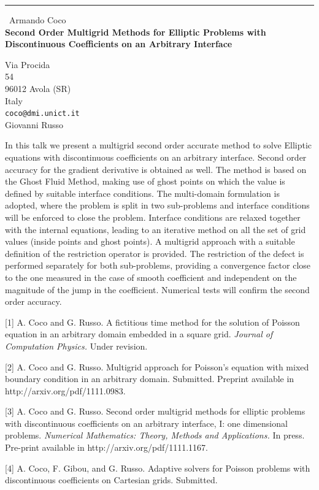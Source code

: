 \documentclass{report}
\begin{document}
\begin{center}
\rule{6in}{1pt} \
{\large Armando Coco \\
{\bf Second Order Multigrid Methods for Elliptic Problems with Discontinuous Coefficients on an Arbitrary Interface}}

Via Procida \\ 54 \\ 96012 Avola (SR) \\ Italy
\\
{\tt coco@dmi.unict.it}\\
Giovanni Russo\end{center}

In this talk we present a multigrid second order accurate method to solve
Elliptic equations with discontinuous coefficients on an arbitrary
interface. Second order accuracy for the gradient derivative is obtained
as well. The method is based on the Ghost Fluid Method, making use of
ghost points on which the value is defined by suitable interface
conditions. The multi-domain formulation is adopted, where the problem is
split in two sub-problems and interface conditions will be enforced to
close the problem. Interface conditions are relaxed together with the
internal equations, leading to an iterative method on all the set of grid
values (inside points and ghost points). A multigrid approach with a
suitable definition of the restriction operator is provided. The
restriction of the defect is performed separately for both sub-problems,
providing a convergence factor close to the one measured in the case of
smooth coefficient and independent on the magnitude of the jump in the
coefficient.
Numerical tests will confirm the second order accuracy.

\vspace{1 cm}

[1] A. Coco and G. Russo. A fictitious time method for the solution of
Poisson equation in an arbitrary domain embedded in a square grid.
{\em Journal of Computation Physics.} Under revision.

[2] A. Coco and G. Russo. Multigrid approach for Poisson's equation with
mixed boundary condition in an arbitrary domain. Submitted. Preprint
available in http://arxiv.org/pdf/1111.0983.

[3] A. Coco and G. Russo. Second order multigrid methods for elliptic
problems with discontinuous coefficients on an arbitrary interface, I:
one dimensional problems.
{\em Numerical Mathematics: Theory, Methods and Applications.}
In press. Pre-print available in
http://arxiv.org/pdf/1111.1167.

[4] A. Coco, F. Gibou, and G. Russo. Adaptive solvers for Poisson
problems with discontinuous coefficients on Cartesian grids. Submitted.
\end{document}
